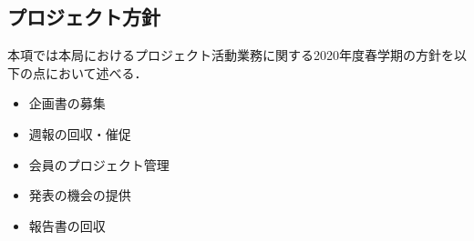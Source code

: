 ﻿\subsection*{プロジェクト方針}


本項では本局におけるプロジェクト活動業務に関する2020年度春学期の方針を以下の点において述べる．

\begin{itemize}
\item 企画書の募集
\item 週報の回収・催促
\item 会員のプロジェクト管理
\item 発表の機会の提供
\item 報告書の回収
\end{itemize}

